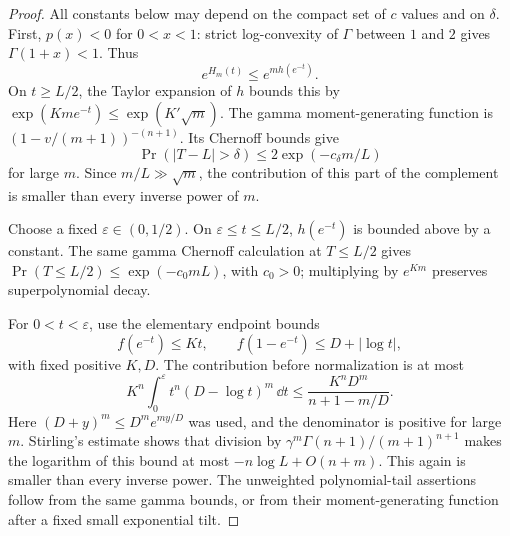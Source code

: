 \begin{proof}
All constants below may depend on the compact set of $c$ values and on
$\delta$. First, $p(x)<0$ for $0<x<1$: strict log-convexity of $\Gamma$
between $1$ and $2$ gives $\Gamma(1+x)<1$. Thus
\[
 e^{H_m(t)}\le e^{mh(e^{-t})}.
\]
On $t\ge L/2$, the Taylor expansion of $h$ bounds this by
$\exp(Kme^{-t})\le\exp(K'\sqrt m)$. The gamma moment-generating
function is $(1-v/(m+1))^{-(n+1)}$. Its Chernoff bounds give
\[
 \Pr(|T-L|>\delta)\le 2\exp(-c_\delta m/L)
\]
for large $m$. Since $m/L\gg\sqrt m$, the contribution of this
part of the complement is smaller than every inverse power of $m$.

Choose a fixed $\varepsilon\in(0,1/2)$. On
$\varepsilon\le t\le L/2$, $h(e^{-t})$ is bounded above by a
constant. The same gamma Chernoff calculation at $T\le L/2$ gives
$\Pr(T\le L/2)\le\exp(-c_0mL)$, with $c_0>0$; multiplying by
$e^{Km}$ preserves superpolynomial decay.

For $0<t<\varepsilon$, use the elementary endpoint bounds
\[
 f(e^{-t})\le Kt,\qquad
 f(1-e^{-t})\le D+|\log t|,
\]
with fixed positive $K,D$. The contribution before normalization is
at most
\[
 K^n\int_0^\varepsilon t^n(D-\log t)^m\,\dd t
 \le\frac{K^nD^m}{n+1-m/D}.
\]
Here $(D+y)^m\le D^m e^{my/D}$ was used, and the denominator is
positive for large $m$. Stirling's estimate shows that division by
$\gamma^m\Gamma(n+1)/(m+1)^{n+1}$ makes the logarithm of this
bound at most $-n\log L+O(n+m)$. This again is smaller than every
inverse power. The unweighted polynomial-tail assertions follow
from the same gamma bounds, or from their moment-generating
function after a fixed small exponential tilt.
\end{proof}

